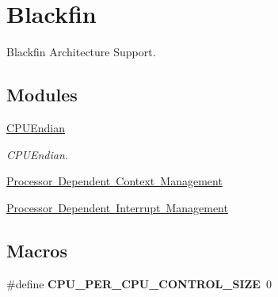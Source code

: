 \hypertarget{group__RTEMSScoreCPUBfin}{}\section{Blackfin}
\label{group__RTEMSScoreCPUBfin}


Blackfin Architecture Support.  


\subsection*{Modules}
\begin{DoxyCompactItemize}
\item 
\mbox{\hyperlink{group__RTEMSScoreCPUBfinCPUEndian}{C\+P\+U\+Endian}}
\begin{DoxyCompactList}\small\item\em C\+P\+U\+Endian. \end{DoxyCompactList}\item 
\mbox{\hyperlink{group__RTEMSScoreCPUBfinCPUContext}{Processor Dependent Context Management}}
\item 
\mbox{\hyperlink{group__RTEMSScoreCPUBfinCPUInterrupt}{Processor Dependent Interrupt Management}}
\end{DoxyCompactItemize}
\subsection*{Macros}
\begin{DoxyCompactItemize}
\item 
\mbox{\label{group__RTEMSScoreCPUBfin_gaf8e38596ad3db49995fd8eb9fb4e86b2}} 
\#define {\bfseries C\+P\+U\+\_\+\+P\+E\+R\+\_\+\+C\+P\+U\+\_\+\+C\+O\+N\+T\+R\+O\+L\+\_\+\+S\+I\+ZE}~0
\end{DoxyCompactItemize}
